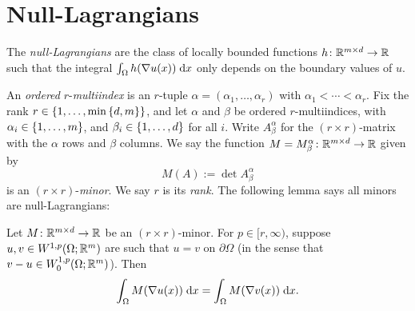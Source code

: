 \section{Null-Lagrangians}
The \textit{null-Lagrangians} are the class of locally bounded functions $h \colon \mathbb{R}^{m \times d} \to \mathbb{R}$ such that the integral $\int_\Omega h(\nabla u(x)) \; \mathrm{d} x$ only depends on the boundary values of $u$.

An \textit{ordered } $r$-\textit{multiindex} is an $r$-tuple $\alpha = (\alpha_1,\dots,\alpha_r)$ with $\alpha_1 < \cdots < \alpha_r$. Fix the rank $r \in \left\{ {1,\dots,\min\left\{ {d,m} \right\}} \right\}$, and let $\alpha$ and $\beta$ be ordered $r$-multiindices, with $\alpha_i \in \left\{ {1,\dots,m} \right\}$, and $\beta_i \in \left\{ {1,\dots,d} \right\}$ for all $i$. Write $A_\beta^\alpha$ for the $(r \times r)$-matrix with the $\alpha$ rows and $\beta$ columns. We say the function $M = M_\beta^\alpha \colon \mathbb{R}^{m \times d} \to \mathbb{R}$ given by 
\begin{equation}
    M(A) := \det{A_\beta^\alpha}
\end{equation}
is an $(r \times r)$-\textit{minor}. We say $r$ is its \textit{rank}. The following lemma says all minors are null-Lagrangians:
\begin{lemma} \label{lem:minorsAreNullLagrangians}
    Let $M \colon \mathbb{R}^{m \times d} \to \mathbb{R}$ be an $(r \times r)$-minor. For $p \in [r,\infty)$, suppose $u,v \in W^{1,p}(\Omega;\mathbb{R}^m)$ are such that $u = v$ on $\partial\Omega$ (in the sense that $v - u \in W_0^{1,p}(\Omega;\mathbb{R}^m)$). Then 
    \begin{equation}
        \int_\Omega M(\nabla u(x)) \; \mathrm{d} x = \int_\Omega M(\nabla v(x)) \; \mathrm{d} x.
    \end{equation}
\end{lemma}
